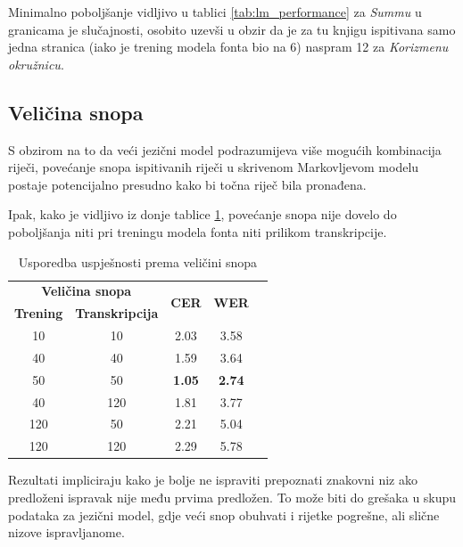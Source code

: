 \documentclass[zavrsnirad]{fer}
\begin{document}
Minimalno poboljšanje vidljivo u tablici \ref{tab:lm_performance} za \textit{Summu} u granicama je slučajnosti, osobito uzevši u obzir da je za tu knjigu ispitivana samo jedna stranica (iako je trening modela fonta bio na 6) naspram 12 za \textit{Korizmenu okružnicu}.

\subsection{Veličina snopa}

S obzirom na to da veći jezični model podrazumijeva više mogućih kombinacija riječi, povećanje snopa ispitivanih riječi u skrivenom Markovljevom modelu postaje potencijalno presudno kako bi točna riječ bila pronađena.

Ipak, kako je vidljivo iz donje tablice \ref{tab:7.2}, povećanje snopa nije dovelo do poboljšanja niti pri treningu modela fonta niti prilikom transkripcije.

\bgroup
\def\arraystretch{1.25}
\begin{table}[h]
	\centering
	\begin{tabular}{|c|c|c|c|c|}
		\hline 
		\multicolumn{2}{|c|}{\textbf{Veličina snopa}} & \multicolumn{1}{|c|}{\multirow{2}{*}{\textbf{CER}}} & \multicolumn{1}{|c|}{\multirow{2}{*}{\textbf{WER}}} \\ \cline{1-2}
		
		\textbf{Trening}  & \textbf{Transkripcija}  & \multicolumn{1}{|c|}{}  & \multicolumn{1}{|c|}{}  \\ \hline
		10  & 10 &  2.03 & 3.58  \\ \hline
		40 & 40 &  1.59 & 3.64   \\ \hline
		50 & 50 &  \textbf{1.05} & \textbf{2.74}   \\ \hline
		40 & 120 & 1.81 & 3.77   \\ \hline
		120 & 50 & 2.21 & 5.04 \\ \hline        
		120 & 120 & 2.29 & 5.78 \\ \hline                                             
	\end{tabular}
	\caption{Usporedba uspješnosti prema veličini snopa}
	\label{tab:7.2}
\end{table}
\egroup

Rezultati impliciraju kako je bolje ne ispraviti prepoznati znakovni niz ako predloženi ispravak nije među prvima predložen. To može biti do grešaka u skupu podataka za jezični model, gdje veći snop obuhvati i rijetke pogrešne, ali slične nizove ispravljanome. 
\end{document}
